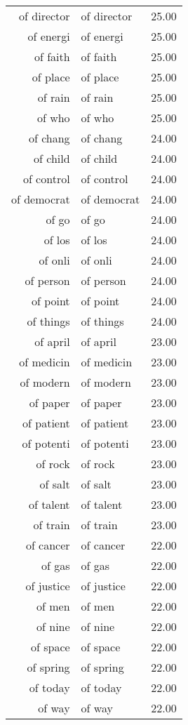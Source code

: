 \begin{table}[ht]
\begin{tabular}{rlr}
  of director & of director & 25.00 \\ 
  of energi & of energi & 25.00 \\ 
  of faith & of faith & 25.00 \\ 
  of place & of place & 25.00 \\ 
  of rain & of rain & 25.00 \\ 
  of who & of who & 25.00 \\ 
  of chang & of chang & 24.00 \\ 
  of child & of child & 24.00 \\ 
  of control & of control & 24.00 \\ 
  of democrat & of democrat & 24.00 \\ 
  of go & of go & 24.00 \\ 
  of los & of los & 24.00 \\ 
  of onli & of onli & 24.00 \\ 
  of person & of person & 24.00 \\ 
  of point & of point & 24.00 \\ 
  of things & of things & 24.00 \\ 
  of april & of april & 23.00 \\ 
  of medicin & of medicin & 23.00 \\ 
  of modern & of modern & 23.00 \\ 
  of paper & of paper & 23.00 \\ 
  of patient & of patient & 23.00 \\ 
  of potenti & of potenti & 23.00 \\ 
  of rock & of rock & 23.00 \\ 
  of salt & of salt & 23.00 \\ 
  of talent & of talent & 23.00 \\ 
  of train & of train & 23.00 \\ 
  of cancer & of cancer & 22.00 \\ 
  of gas & of gas & 22.00 \\ 
  of justice & of justice & 22.00 \\ 
  of men & of men & 22.00 \\ 
  of nine & of nine & 22.00 \\ 
  of space & of space & 22.00 \\ 
  of spring & of spring & 22.00 \\ 
  of today & of today & 22.00 \\ 
  of way & of way & 22.00 \\ 

\end{tabular}
\end{table}
